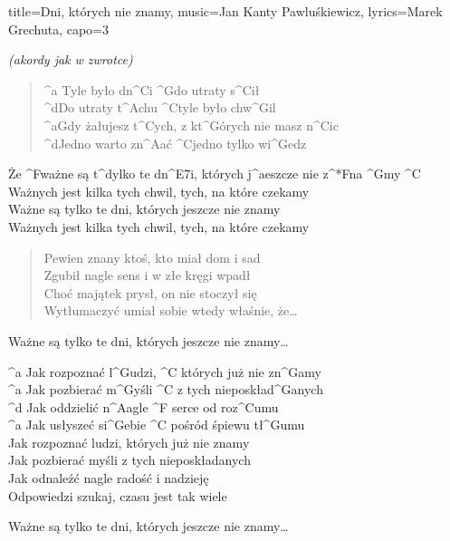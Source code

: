 \newpage
\begin{song}{title={Dni, których nie znamy}, music={Jan Kanty Pawluśkiewicz}, lyrics={Marek Grechuta}, capo=3}
    \begin{intro}
        \textit{(akordy jak w zwrotce)}
   	\end{intro}
   	\begin{verse}
   		^{a} Tyle było dn^{C}i ^{G}do utraty s^{C}ił \\
		^{d}Do utraty t^{A}chu ^{C}tyle było chw^{G}il \\
		^{a}Gdy żałujesz t^{C}ych, z kt^{G}órych nie masz n^{C}ic \\
		^{d}Jedno warto zn^{A}ać ^{C}jedno tylko wi^{G}edz
   	\end{verse}
   	\begin{chorus}
   		Że ^{F}ważne są t^{d}ylko te dn^{E7}i, których j^{a}eszcze nie z^*{F}na ^{G}my ^{C} \\
		Ważnych jest kilka tych chwil, tych, na które czekamy \smallskip \\
		Ważne są tylko te dni, których jeszcze nie znamy \\
		Ważnych jest kilka tych chwil, tych, na które czekamy
   	\end{chorus}
   	\begin{verse}
   		Pewien znany ktoś, kto miał dom i sad \\
		Zgubił nagle sens i w złe kręgi wpadł \smallskip \\
		Choć majątek prysł, on nie stoczył się \\
		Wytłumaczyć umiał sobie wtedy właśnie, że\ldots
   	\end{verse}
   	\begin{chorus}
   		Ważne są tylko te dni, których jeszcze nie znamy\ldots
   	\end{chorus}
   	\begin{interlude}
   		^{a} Jak rozpoznać l^{G}udzi, ^{C} których już nie zn^{G}amy \\
	   	^{a} Jak pozbierać m^{G}yśli ^{C} z tych nieposkład^{G}anych \\
	   	^{d} Jak oddzielić n^{A}agle ^{F} serce od roz^{C}umu \\
   		^{a} Jak usłyszeć si^{G}ebie ^{C} pośród śpiewu tł^{G}umu \medskip \\
		Jak rozpoznać ludzi, których już nie znamy \\
		Jak pozbierać myśli z tych nieposkładanych \\
		Jak odnaleźć nagle radość i nadzieję \\ 
		Odpowiedzi szukaj, czasu jest tak wiele
   	\end{interlude}
   	\begin{chorus}
   		Ważne są tylko te dni, których jeszcze nie znamy\ldots
   	\end{chorus}
\end{song}

